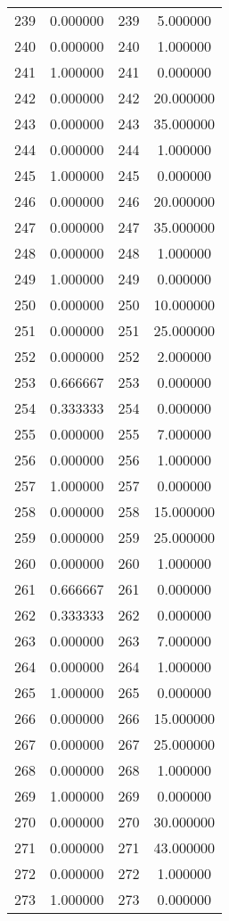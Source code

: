 \documentclass[12pt]{article}
\begin{document}
\begin{longtable}{@{}cccc@{}}
239 & 0.000000 & 239 & 5.000000 \\
240 & 0.000000 & 240 & 1.000000 \\
241 & 1.000000 & 241 & 0.000000 \\
242 & 0.000000 & 242 & 20.000000 \\
243 & 0.000000 & 243 & 35.000000 \\
244 & 0.000000 & 244 & 1.000000 \\
245 & 1.000000 & 245 & 0.000000 \\
246 & 0.000000 & 246 & 20.000000 \\
247 & 0.000000 & 247 & 35.000000 \\
248 & 0.000000 & 248 & 1.000000 \\
249 & 1.000000 & 249 & 0.000000 \\
250 & 0.000000 & 250 & 10.000000 \\
251 & 0.000000 & 251 & 25.000000 \\
252 & 0.000000 & 252 & 2.000000 \\
253 & 0.666667 & 253 & 0.000000 \\
254 & 0.333333 & 254 & 0.000000 \\
255 & 0.000000 & 255 & 7.000000 \\
256 & 0.000000 & 256 & 1.000000 \\
257 & 1.000000 & 257 & 0.000000 \\
258 & 0.000000 & 258 & 15.000000 \\
259 & 0.000000 & 259 & 25.000000 \\
260 & 0.000000 & 260 & 1.000000 \\
261 & 0.666667 & 261 & 0.000000 \\
262 & 0.333333 & 262 & 0.000000 \\
263 & 0.000000 & 263 & 7.000000 \\
264 & 0.000000 & 264 & 1.000000 \\
265 & 1.000000 & 265 & 0.000000 \\
266 & 0.000000 & 266 & 15.000000 \\
267 & 0.000000 & 267 & 25.000000 \\
268 & 0.000000 & 268 & 1.000000 \\
269 & 1.000000 & 269 & 0.000000 \\
270 & 0.000000 & 270 & 30.000000 \\
271 & 0.000000 & 271 & 43.000000 \\
272 & 0.000000 & 272 & 1.000000 \\
273 & 1.000000 & 273 & 0.000000 \\

\end{longtable}
\end{document}
